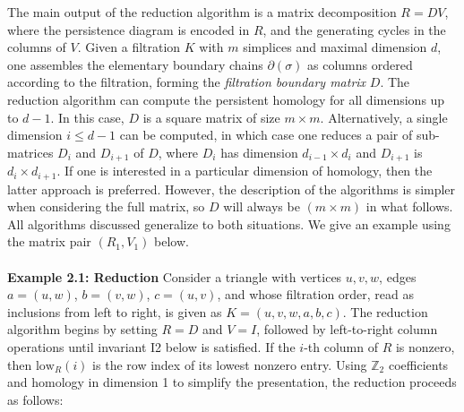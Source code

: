 \documentclass{article} %
\begin{document}
 The main output of the reduction algorithm is a matrix decomposition $R = D V$, where the persistence diagram is encoded in $R$, and the generating cycles in the columns of $V$. 
 Given a  filtration $K$ with $m$ simplices and maximal dimension $d$, 
 one assembles the elementary boundary chains $\partial(\sigma)$ as columns ordered according to the filtration, forming the \emph{filtration boundary matrix} $D$. 
 The reduction algorithm can  compute the persistent homology for all dimensions up to $d - 1$.
 In this case,  $D$ is a square matrix of size $m \times m$. Alternatively, a single dimension $i \leq d - 1$ can be computed, in which case one reduces a pair of sub-matrices  $D_i$ and $ D_{i+1}$ of $D$,  where $D_i$ has dimension $d_{i-1} \times d_i$ and $D_{i+1}$ is  $d_{i} \times d_{i+1}$. 
 If one is interested in a particular dimension of homology, then the latter approach is preferred. However, the  description of the algorithms is simpler when considering the full matrix, so $D$ will always be $(m \times m)$ in what follows. 
 All algorithms discussed generalize to both situations. We give an example using the matrix pair $(R_1, V_1)$  below. 
\\
\\
\noindent
\textbf{Example 2.1: Reduction} Consider a triangle with vertices $u,v,w$, edges $a = (u,w)$, $b = (v,w)$, $c = (u, v)$,
and whose filtration order, read as inclusions from left to right, is given as $K = (u, v, w, a, b, c)$. The reduction algorithm begins by setting $R = D$ and $V = I$, followed by left-to-right column operations until invariant I2 below is satisfied.
If the $i$-th column of $R$ is nonzero, then $\mathrm{low}_R(i)$ 
is the row index of its lowest nonzero entry.
Using $\mathbb{Z}_2$ coefficients and homology in dimension 1 to simplify the presentation, the reduction proceeds as follows:
\end{document}
